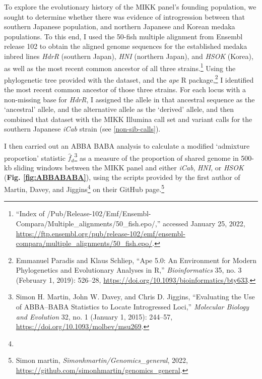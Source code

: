 \documentclass[
]{book}
\begin{document}
To explore the evolutionary history of the MIKK panel's founding population, we sought to determine whether there was evidence of introgression between that southern Japanese population, and northern Japanese and Korean medaka populations. To this end, I used the 50-fish multiple alignment from Ensembl release 102 to obtain the aligned genome sequences for the established medaka inbred lines \emph{HdrR} (southern Japan), \emph{HNI} (northern Japan), and \emph{HSOK} (Korea), as well as the most recent common ancestor of all three strains.\footnote{{``Index of /Pub/Release-102/Emf/Ensembl-Compara/Multiple\_alignments/50\_fish.epo/,''} accessed January 25, 2022, \url{https://ftp.ensembl.org/pub/release-102/emf/ensembl-compara/multiple_alignments/50_fish.epo/}.} Using the phylogenetic tree provided with the dataset, and the \emph{ape} R package,\footnote{Emmanuel Paradis and Klaus Schliep, {``Ape 5.0: An Environment for Modern Phylogenetics and Evolutionary Analyses in {R},''} \emph{Bioinformatics} 35, no. 3 (February 1, 2019): 526--28, \url{https://doi.org/10.1093/bioinformatics/bty633}.} I identified the most recent common ancestor of those three strains. For each locus with a non-missing base for \emph{HdrR}, I assigned the allele in that ancestral sequence as the `ancestral' allele, and the alternative allele as the `derived' allele, and then combined that dataset with the MIKK Illumina call set and variant calls for the southern Japanese \emph{iCab} strain (see \ref{non-sib-calls}).

I then carried out an ABBA BABA analysis to calculate a modified `admixture proportion' statistic \(\hat{f}_d\)\footnote{Simon H. Martin, John W. Davey, and Chris D. Jiggins, {``Evaluating the {Use} of {ABBA}--{BABA Statistics} to {Locate Introgressed Loci},''} \emph{Molecular Biology and Evolution} 32, no. 1 (January 1, 2015): 244--57, \url{https://doi.org/10.1093/molbev/msu269}.} as a measure of the proportion of shared genome in 500-kb sliding windows between the MIKK panel and either \emph{iCab}, \emph{HNI}, or \emph{HSOK} (\textbf{Fig. \ref{fig:ABBABABA}}), using the scripts provided by the first author of Martin, Davey, and Jiggins\footnote{} on their GitHub page.\footnote{Simon martin, \emph{Simonhmartin/Genomics\_general}, 2022, \url{https://github.com/simonhmartin/genomics_general}.}
\end{document}
